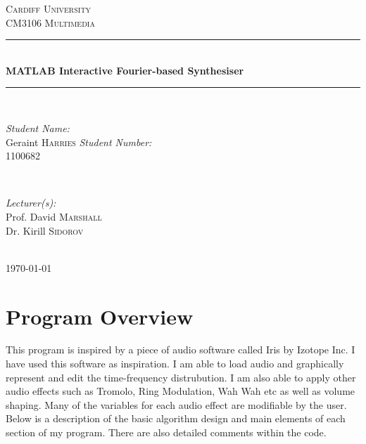 \documentclass[12pt]{article}
\begin{document}
		\begin{titlepage}

			\newcommand{\HRule}{\rule{\linewidth}{0.5mm}}
			\center
 
			\textsc{\LARGE Cardiff University}\\[1.5cm] 
			\textsc{\Large CM3106 Multimedia}\\[0.5cm] 

			\HRule \\[0.4cm]
				{ \huge \bfseries MATLAB Interactive Fourier-based Synthesiser}\\[0.4cm] 
			\HRule \\[1.5cm]
 
			\begin{minipage}{0.4\textwidth}
				\begin{flushleft} \large
					\emph{Student Name:}\\
						Geraint \textsc{Harries} \newline
					\emph{Student Number:}\\
						1100682
				\end{flushleft}
			\end{minipage}
			~
			\begin{minipage}{0.4\textwidth}
				\begin{flushright} \large
					\emph{Lecturer(s):} \\
						Prof. David \textsc{Marshall} \\
						Dr. Kirill \textsc{Sidorov}
				\end{flushright}
			\end{minipage}\\[4cm]

			{\large \today}\\[3cm] 

			\vfill 

		\end{titlepage}
		
		\section{Program Overview}

			This program is inspired by a piece of audio software called Iris by Izotope Inc. I have used this software as inspiration. I am able to load audio and graphically represent and edit the time-frequency distrubution. I am also able to apply other audio effects such as Tromolo, Ring Modulation, Wah Wah etc as well as volume shaping. Many of the variables for each audio effect are modifiable by the user. Below is a description of the basic algorithm design and main elements of each section of my program. There are also detailed comments within the code.   
\end{document}
